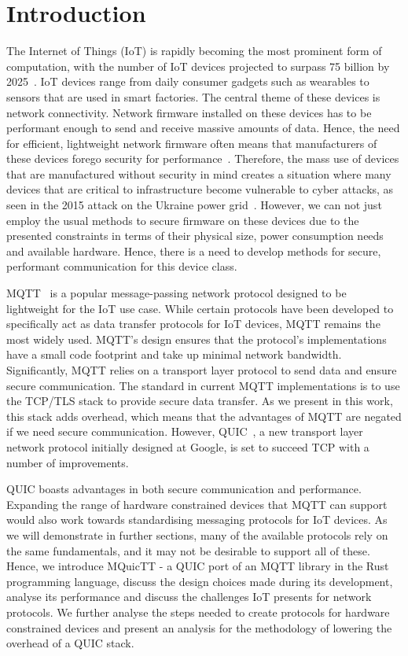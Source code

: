\chapter{Introduction}


The Internet of Things (IoT) is rapidly becoming the most prominent form of computation, with the number of IoT devices projected to surpass 75 billion by 2025~\citep{statista_number_2016}.
IoT devices range from daily consumer gadgets such as wearables to sensors that are used in smart factories.
The central theme of these devices is network connectivity.
Network firmware installed on these devices has to be performant enough to send and receive massive amounts of data. 
Hence, the need for efficient, lightweight network firmware often means that manufacturers of these devices forego security for performance~\cite{ling_iot_2018}.
Therefore, the mass use of devices that are manufactured without security in mind creates a situation where many devices that are critical to infrastructure become vulnerable to cyber attacks, as seen in the 2015 attack on the Ukraine power grid~\citep{Liang2017}.
However, we can not just employ the usual methods to secure firmware on these devices due to the presented constraints in terms of their physical size, power consumption needs and available hardware.
Hence, there is a need to develop methods for secure, performant communication for this device class.

MQTT~\citep{oasis_mqtt_2014} is a popular message-passing network protocol designed to be lightweight for the IoT use case.
While certain protocols have been developed to specifically act as data transfer protocols for IoT devices, MQTT remains the most widely used.
MQTT's design ensures that the protocol's implementations have a small code footprint and take up minimal network bandwidth.
Significantly, MQTT relies on a transport layer protocol to send data and ensure secure communication.
The standard in current MQTT implementations is to use the TCP/TLS stack to provide secure data transfer.
As we present in this work, this stack adds overhead, which means that the advantages of MQTT are negated if we need secure communication.
However, QUIC~\citep{iyengar_quic_2021}, a new transport layer network protocol initially designed at Google, is set to succeed TCP with a number of improvements.

QUIC boasts advantages in both secure communication and performance. 
Expanding the range of hardware constrained devices that MQTT can support would also work towards standardising messaging protocols for IoT devices.
As we will demonstrate in further sections, many of the available protocols rely on the same fundamentals, and it may not be desirable to support all of these.
Hence, we introduce MQuicTT - a QUIC port of an MQTT library in the Rust programming language, discuss the design choices made during its development, analyse its performance and discuss the challenges IoT presents for network protocols.
We further analyse the steps needed to create protocols for hardware constrained devices and present an analysis for the methodology of lowering the overhead of a QUIC stack.


